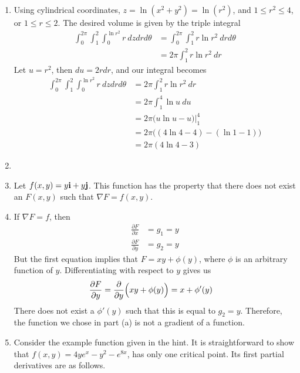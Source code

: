\documentclass{article}
\begin{document}
\begin{enumerate}
\item %
Using cylindrical coordinates, $ z =\ln(x^2+y^2) = \ln(r^2)$, and $1 \le r^2 \le 4$, or $1\le r \le 2$. The desired volume is given by the triple integral
\begin{align*}
  {\int_0^{2\pi} \!\! \int_{1}^{2} \!\! \int_{0}^{\ln r^2}} r\ dz dr d\theta 
  &= {\int_0^{2\pi} \!\! \int_{1}^{2}} r\ln r^2 \  dr d\theta \\
  &=2\pi \int_{1}^{2} r\ln r^2 \  dr 
\end{align*}
Let $u=r^2$, then $du = 2rdr$, and our integral becomes
\begin{align*}
  {\int_0^{2\pi} \!\! \int_{1}^{2} \!\! \int_{0}^{\ln r^2}} r\ dz dr d\theta 
  &=2\pi \int_{1}^{2} r\ln r^2 \  dr \\
  &=2\pi \int_{1}^{4} \ln u \  du  \\
  &=2\pi\Big( u \ln u -u \Big)\Big|_{1}^{4}  \\
  &=2\pi\Big( (4 \ln 4 -4)-(\ln 1 -1)  \Big)  \\
  &=2\pi (4 \ln 4 - 3)
\end{align*}
\item %
\BEN
\item Let $f(x,y) = y \mathbf{i} + y \mathbf{j}$. This function has the property that there does not exist an $F(x,y)$ such that $\nabla F = f(x,y)$. 
\item If $\nabla F = f$, then 
\begin{align}
  \frac{\partial F}{\partial x} &= g_1 = y \\
  \frac{\partial F}{\partial y} &= g_2 = y 
\end{align}
But the first equation implies that $F=xy+\phi(y)$, where $\phi$ is an arbitrary function of $y$. Differentiating with respect to $y$ gives us
\begin{align}
  \frac{\partial F}{\partial y} &= \frac{\partial}{\partial y} \Big(xy+\phi(y)\Big) = x + \phi'(y)
\end{align}
There does not exist a $\phi'(y)$ such that this is equal to $g_2=y$. Therefore, the function we chose in part (a) is not a gradient of a function. 
\EEN
\item %
Consider the example function given in the hint. It is straightforward to show that $f(x,y)=4ye^x-y^2-e^{8x}$, has only one critical point. Its first partial derivatives are as follows.

\end{enumerate}
\end{document}
